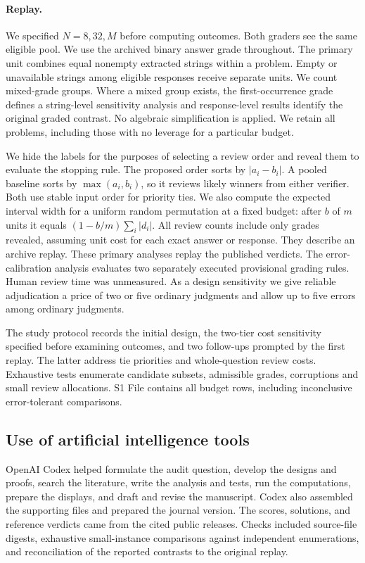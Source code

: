 \documentclass[10pt,letterpaper]{article}
\begin{document}
\paragraph{Replay.}
We specified $N=8,32,M$ before computing outcomes. Both graders see the same eligible pool. We use the archived binary answer grade throughout. The primary unit combines equal nonempty extracted strings within a problem. Empty or unavailable strings among eligible responses receive separate units. We count mixed-grade groups. Where a mixed group exists, the first-occurrence grade defines a string-level sensitivity analysis and response-level results identify the original graded contrast. No algebraic simplification is applied. We retain all problems, including those with no leverage for a particular budget.

We hide the labels for the purposes of selecting a review order and reveal them to evaluate the stopping rule. The proposed order sorts by $|a_i-b_i|$. A pooled baseline sorts by $\max(a_i,b_i)$, so it reviews likely winners from either verifier. Both use stable input order for priority ties. We also compute the expected interval width for a uniform random permutation at a fixed budget: after $b$ of $m$ units it equals $(1-b/m)\sum_i |d_i|$. All review counts include only grades revealed, assuming unit cost for each exact answer or response. They describe an archive replay. These primary analyses replay the published verdicts. The error-calibration analysis evaluates two separately executed provisional grading rules. Human review time was unmeasured. As a design sensitivity we give reliable adjudication a price of two or five ordinary judgments and allow up to five errors among ordinary judgments.

The study protocol records the initial design, the two-tier cost sensitivity specified before examining outcomes, and two follow-ups prompted by the first replay. The latter address tie priorities and whole-question review costs. Exhaustive tests enumerate candidate subsets, admissible grades, corruptions and small review allocations. S1 File contains all budget rows, including inconclusive error-tolerant comparisons.

\subsection*{Use of artificial intelligence tools} OpenAI Codex helped formulate the audit question, develop the designs and proofs, search the literature, write the analysis and tests, run the computations, prepare the displays, and draft and revise the manuscript. Codex also assembled the supporting files and prepared the journal version. The scores, solutions, and reference verdicts came from the cited public releases. Checks included source-file digests, exhaustive small-instance comparisons against independent enumerations, and reconciliation of the reported contrasts to the original replay.
\end{document}
